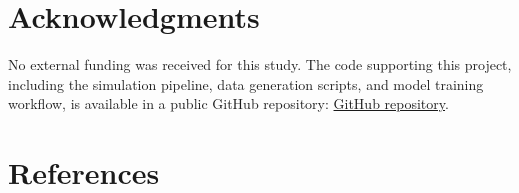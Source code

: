 \documentclass[12pt]{article}
\begin{document}
\section{Acknowledgments}
No external funding was received for this study. The code supporting this project, including the simulation pipeline, data generation scripts, and model training workflow, is available in a public GitHub repository: \href{https://github.com/arnav2deopura-blip/physics-informed-integrator-selection}{GitHub repository}.

\section*{References}
\printbibliography[heading=none]
\end{document}
